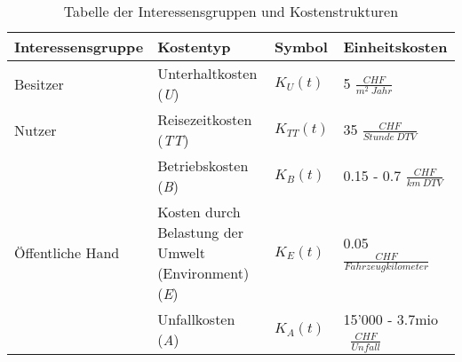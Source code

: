 %
%
%
%

\begin{table}[ht!]
\flushleft
%
%
\begin{tabular}{@{}p{3.5cm} p{4cm} p{1.35cm} p{4.55cm}@{}} \\   
\toprule
\textbf{Interessensgruppe} & \textbf{Kostentyp} & \textbf{Symbol} & \textbf{Einheitskosten} \\
\midrule
Besitzer                   & Unterhaltkosten (\textit{U})                    & $K_{U}(t)$    & 5 $\frac{CHF}{m^2 \ Jahr}$              \\
Nutzer		               & Reisezeitkosten (\textit{TT})                   & $K_{TT}(t)$   & 35 $\frac{CHF}{Stunde \ DTV}$               \\
                           & Betriebskosten (\textit{B})            		 & $K_{B}(t)$    & 0.15 - 0.7 $\frac{CHF}{km \ DTV}$              \\
Öffentliche Hand           & Kosten durch Belastung \newline der Umwelt \newline (Environment) (\textit{E})   & $K_{E}(t)$    & 0.05 $\frac{CHF}{Fahrzeugkilometer}$      \\
                           & Unfallkosten (\textit{A})                       & $K_{A}(t)$    & 15'000 - 3.7mio \ $\frac{CHF}{Unfall}$    \\
\bottomrule

\end{tabular}
\caption{Tabelle der Interessensgruppen und Kostenstrukturen}
\label{tab:t-04-01-Interessensgruppen}
\end{table}


%


